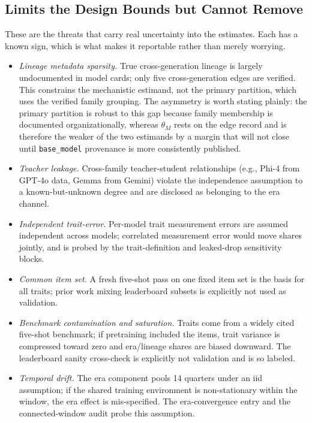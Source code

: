 \documentclass{ieeeaccess}
\theoremstyle{definition}
\theoremstyle{plain}
\begin{document}
\subsection{Limits the Design Bounds but Cannot Remove}
These are the threats that carry real uncertainty into the estimates. Each has
a known sign, which is what makes it reportable rather than merely worrying.
\begin{itemize}
\item \emph{Lineage metadata sparsity.} True cross-generation lineage is largely
  undocumented in model cards; only five cross-generation edges are verified.
  This constrains the mechanistic estimand, not the primary partition, which uses
  the verified family grouping. The asymmetry is worth stating plainly: the
  primary partition is robust to this gap because family membership is
  documented organizationally, whereas $\theta_{M}$ rests on the edge record and
  is therefore the weaker of the two estimands by a margin that will not close
  until \texttt{base\_model} provenance is more consistently published.
\item \emph{Teacher leakage.} Cross-family teacher-student relationships (e.g.,
  Phi-4 from GPT-4o data, Gemma from Gemini) violate the independence assumption to
  a known-but-unknown degree and are disclosed as belonging to the era channel.
\item \emph{Independent trait-error.} Per-model trait measurement errors are
  assumed independent across models; correlated measurement error would move shares
  jointly, and is probed by the trait-definition and leaked-drop sensitivity blocks.
\item \emph{Common item set.} A fresh five-shot pass on one fixed item set is the
  basis for all traits; prior work mixing leaderboard subsets is explicitly not used
  as validation.
\item \emph{Benchmark contamination and saturation.} Traits come from a widely cited
  five-shot benchmark; if pretraining included the items, trait variance is
  compressed toward zero and era/lineage shares are biased downward. The
  leaderboard sanity cross-check is explicitly not validation and is so labeled.
\item \emph{Temporal drift.} The era component pools 14 quarters under an iid
  assumption; if the shared training environment is non-stationary within the
  window, the era effect is mis-specified. The era-convergence entry and the
  connected-window audit probe this assumption.
\end{itemize}
\end{document}
